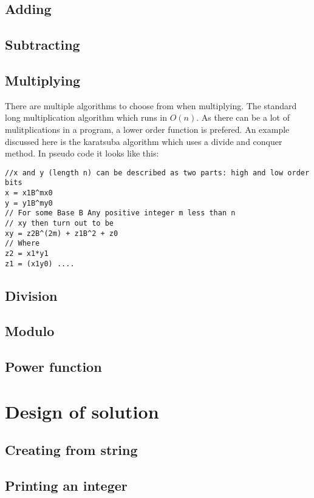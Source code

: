 \documentclass[a4paper,11pt]{article}
\begin{document}
\subsection{Adding}

\subsection{Subtracting}

\subsection{Multiplying}
There are multiple algorithms to choose from when multiplying.
The standard long multiplication algorithm which runs in $O(n)$.
As there can be a lot of mulitplications in a program, a lower order function is prefered.
An example discussed here is the karatsuba algorithm which uses a divide and conquer method.
In pseudo code it looks like this:
\begin{lstlisting}
//x and y (length n) can be described as two parts: high and low order bits
x = x1B^mx0
y = y1B^my0
// For some Base B Any positive integer m less than n
// xy then turn out to be
xy = z2B^(2m) + z1B^2 + z0
// Where
z2 = x1*y1
z1 = (x1y0) ....
\end{lstlisting}



\subsection{Division}

\subsection{Modulo}

\subsection{Power function}


\section{Design of solution}

\subsection{Creating from string}

\subsection{Printing an integer}
\end{document}
